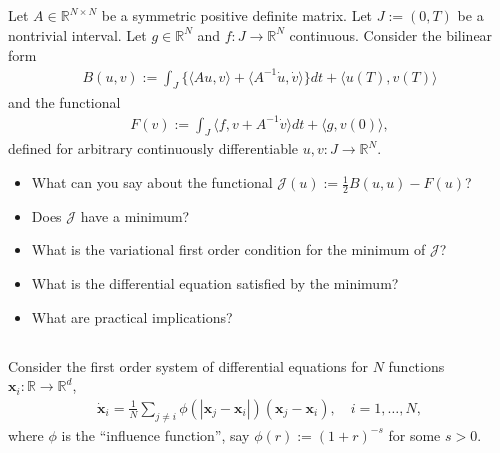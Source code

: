 \documentclass[12pt,a4paper]{article}
\newcommand{\from}{\colon}
\begin{document}
    \subsection{}
    
    Let $A \in \mathbb{R}^{N \times N}$ be a symmetric positive definite matrix.
    Let $J := (0, T)$ be a nontrivial interval.
    Let $g \in \mathbb{R}^N$ and $f \from J \to \mathbb{R}^N$ continuous.
    Consider the bilinear form
    \begin{align}
        B(u, v) :=
        \int_J \{
            \langle A u, v \rangle
            +
            \langle A^{-1} \dot{u}, \dot{v} \rangle
        \} dt
        +
        \langle u(T), v(T) \rangle
    \end{align}
    and the functional
    \begin{align}
        F(v) :=
        \int_J 
            \langle f, v + A^{-1} \dot{v} \rangle
        dt
        +
        \langle g, v(0) \rangle
        ,
    \end{align}
    defined for
    arbitrary continuously
    differentiable 
    $u, v \from J \to \mathbb{R}^N$.
    
    \begin{itemize}
    \item
        What can you say about the functional
        $
            \mathcal{J}(u) :=
            \frac12 B(u, u) - F(u)
        $?
    \item
        Does $\mathcal{J}$ have a minimum?
    \item
        What is the variational first order condition for the minimum of $\mathcal{J}$?
    \item
        What is the differential equation satisfied by the minimum?
    \item
        What are practical implications?
    \end{itemize}

    

    
    \subsection{}
    
    Consider the first order system of differential equations
    for $N$ functions $\mathbf{x}_i \from \mathbb{R} \to \mathbb{R}^d$,
    \begin{align}
        \dot{\mathbf{x}}_i
        =
        \frac{1}{N} 
        \sum_{j \neq i}
        \phi(|\mathbf{x}_j - \mathbf{x}_i|)
        ( \mathbf{x}_j - \mathbf{x}_i )
        ,
        \quad
        i = 1, \ldots, N
        ,
    \end{align}
    where $\phi$ is the ``influence function'',
    say $\phi(r) := (1 + r)^{-s}$ for some $s > 0$.
    
\end{document}
